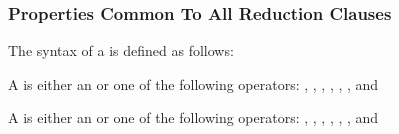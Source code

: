 \subsubsection{Properties Common To All Reduction Clauses}
\label{subsubsec:Properties Common To All Reduction Clauses}

\syntax
The syntax of a  is defined as follows:
\begin{cspecific} %
A  is either an  or one of the following operators:
\code{+},
\code{-},
\code{*},
\code{&},
\code{|},
\code{^},
\code{&&} and
\code{||}
\end{cspecific} %

\begin{cppspecific} %
A  is either an  or one of the following operators:
\code{+},
\code{-},
\code{*},
\code{&},
\code{|},
\code{^},
\code{&&} and
\code{||}
\end{cppspecific} %

